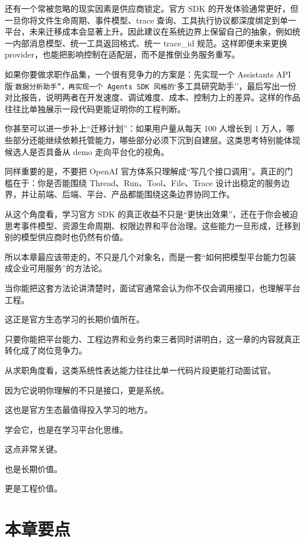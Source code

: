 还有一个常被忽略的现实因素是供应商锁定。官方 SDK 的开发体验通常更好，但一旦你将文件生命周期、事件模型、trace 查询、工具执行协议都深度绑定到单一平台，未来迁移成本会显著上升。因此建议在系统边界上保留自己的抽象，例如统一内部消息模型、统一工具返回格式、统一 trace\_id 规范。这样即便未来更换 provider，也能把影响控制在适配层，而不是推倒业务服务重写。


如果你要做求职作品集，一个很有竞争力的方案是：先实现一个 Assistants API 版`\texttt{数据分析助手''，再实现一个 Agents SDK 风格的}`多工具研究助手''，最后写出一份对比报告，说明两者在开发速度、调试难度、成本、控制力上的差异。这样的作品往往比单独展示一段代码更能证明你的工程判断。


你甚至可以进一步补上``迁移计划''：如果用户量从每天 100 人增长到 1 万人，哪些部分还能继续依赖托管能力，哪些部分必须下沉到自建层。这类思考特别能体现候选人是否具备从 demo 走向平台化的视角。


同样重要的是，不要把 OpenAI 官方体系只理解成``写几个接口调用''。真正的门槛在于：你是否能围绕 Thread、Run、Tool、File、Trace 设计出稳定的服务边界，并让前端、后端、平台、产品都能围绕这条边界协同工作。


从这个角度看，学习官方 SDK 的真正收益不只是``更快出效果''，还在于你会被迫思考事件模型、资源生命周期、权限边界和平台治理。这些能力一旦形成，迁移到别的模型供应商时也仍然有价值。


所以本章最应该带走的，不只是几个对象名，而是一套``如何把模型平台能力包装成企业可用服务''的方法论。


当你能把这套方法论讲清楚时，面试官通常会认为你不仅会调用接口，也理解平台工程。


这正是官方生态学习的长期价值所在。


只要你能把平台能力、工程边界和业务约束三者同时讲明白，这一章的内容就真正转化成了岗位竞争力。


从求职角度看，这类系统性表达能力往往比单一代码片段更能打动面试官。


因为它说明你理解的不只是接口，更是系统。


这也是官方生态最值得投入学习的地方。


学会它，也是在学习平台化思维。


这点非常关键。


也是长期价值。


更是工程价值。


\section{本章要点}

